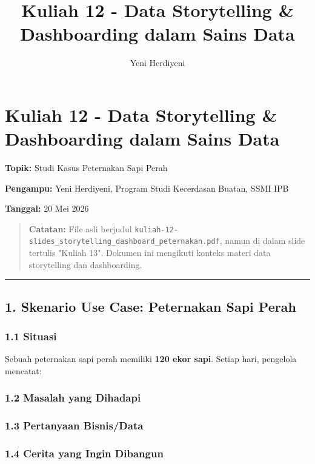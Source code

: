 \documentclass[12pt,a4paper]{article}
\title{Kuliah 12 - Data Storytelling & Dashboarding dalam Sains Data}
\author{Yeni Herdiyeni}
\date{}
\begin{document}
\maketitle
\tableofcontents
\newpage

\section{Kuliah 12 - Data Storytelling & Dashboarding dalam Sains Data}

\textbf{Topik:} Studi Kasus Peternakan Sapi Perah  

\textbf{Pengampu:} Yeni Herdiyeni, Program Studi Kecerdasan Buatan, SSMI IPB  

\textbf{Tanggal:} 20 Mei 2026


\begin{quote}
\textbf{Catatan:} File asli berjudul \texttt{kuliah-12-slides_storytelling_dashboard_peternakan.pdf}, namun di dalam slide tertulis "Kuliah 13". Dokumen ini mengikuti konteks materi data storytelling dan dashboarding.\end{quote}


\hrule


\subsection{1. Skenario Use Case: Peternakan Sapi Perah}

\subsubsection{1.1 Situasi}

Sebuah peternakan sapi perah memiliki \textbf{120 ekor sapi}. Setiap hari, pengelola mencatat:



\subsubsection{1.2 Masalah yang Dihadapi}


\subsubsection{1.3 Pertanyaan Bisnis/Data}


\subsubsection{1.4 Cerita yang Ingin Dibangun}
\end{document}

